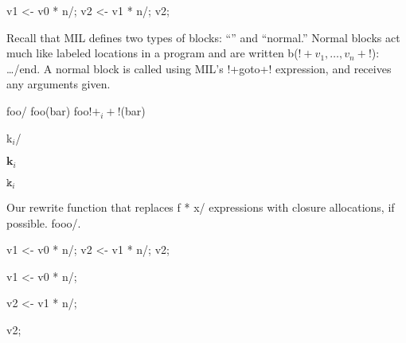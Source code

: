 \documentclass{article}
\begin{document}
\begin{AVerb}
  \vbinds v1 <- \app v0 * n/;
  \vbinds v2 <- \app v1 * n/;
  \return v2; 
\end{AVerb}

Recall \clo[k0:] 
that MIL defines two types of blocks: ``\cc'' and ``normal.''
Normal blocks act much like labeled locations in a program and are
written \block b($!+v_1, \dots, v_n+!$): \dots/end.  A normal block is
called using MIL's !+goto+! expression, and receives any arguments
given. 

\lab foo/ \goto foo(bar)
\goto foo$!+_i+!$(bar)

\lab k$_i$/ 

\ensuremath{\mathbf k_i}

\ensuremath{\mathtt k_i}

\begin{myfig}
  \caption{Our rewrite function that replaces \app f * x/ expressions
    with closure allocations, if possible. \lab fooo/.}
  \label{uncurry_fig_rewrite}
\end{myfig}

\begin{AVerb}
  \vbinds v1 <- \app v0 * n/;
  \vbinds v2 <- \app v1 * n/;
  \return v2; 
\end{AVerb}

  \binds v1 <- \app v0 * n/;

  \binds v2 <- \app v1 * n/;

  \return v2; 
\listoffigures
\end{document}
